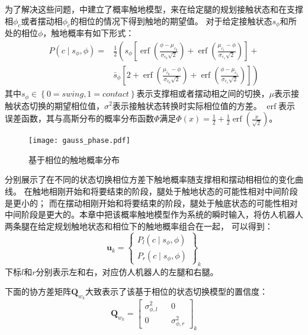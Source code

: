 为了解决这些问题，中建立了概率触地模型，来在给定腿的规划接触状态和在支撑相$\phi_c$或者摆动相$\phi_{\bar c}$的相位的情况下得到触地的期望值。
对于给定接触状态$s_{\phi}$和所处的相位$\phi$，触地概率有如下形式：
\begin{equation}
    \label{equ:est_contact_prob}
    \begin{aligned}
        P\left(c \mid s_\phi, \phi\right)= & \frac{1}{2}\left(s_\phi\left[\operatorname{erf}\left(\frac{\phi-\mu_{c_0}}{\sigma_{c_0} \sqrt{2}}\right)+\operatorname{erf}\left(\frac{\mu_{c_1}-\phi}{\sigma_{c_1} \sqrt{2}}\right)\right]+\right. \\
        & \left.\bar{s}_\phi\left[2+\operatorname{erf}\left(\frac{\mu_{\bar{c}_0}-\phi}{\sigma_{\bar{c}_0} \sqrt{2}}\right)+\operatorname{erf}\left(\frac{\phi-\mu_{\bar{c}_1}}{\sigma_{\bar{c}_1} \sqrt{2}}\right)\right]\right)
        \end{aligned}
\end{equation}
其中$s_{\phi} \in \left\{0=swing, 1=contact\right\}$表示支撑相或者摆动相之间的切换，$\mu$表示接触状态切换的期望相位值，$\sigma^2$表示接触状态转换时实际相位值的方差。
$\operatorname{erf}$表示误差函数，其与高斯分布的概率分布函数$\Phi$满足$\Phi(x)=\frac{1}{2}+\frac{1}{2} \operatorname{erf}\left(\frac{x}{\sqrt{2}}\right)$。
\begin{figure}[htbp]
    \centering
    \texttt{[image: gauss\_phase.pdf]}
    \caption{\label{fig:gauss_phase}基于相位的触地概率分布}
\end{figure}

分别展示了在不同的状态切换相位方差下触地概率随支撑相和摆动相相位的变化曲线。
在触地相刚开始和将要结束的阶段，腿处于触地状态的可能性相对中间阶段是更小的；
而在摆动相刚开始和将要结束的阶段，腿处于触底状态的可能性相对中间阶段是更大的。本章中把该概率触地模型作为系统的瞬时输入，将仿人机器人两条腿在给定规划触地状态和相位下的触地概率组合在一起，
可以得到：
\begin{equation}
    \label{equ:est_input}
    \boldsymbol{u}_k=\left\{\begin{array}{c}
        P_l\left(c \mid s_\phi, \phi\right) \\
        P_r\left(c \mid s_\phi, \phi\right)
        \end{array}\right\}_k
\end{equation}
下标$l$和$r$分别表示左和右，对应仿人机器人的左腿和右腿。

下面的协方差矩阵$\boldsymbol{Q}_{w_k}$大致表示了该基于相位的状态切换模型的置信度：
\begin{equation}
    \label{equ:est_process_noise}
    \boldsymbol{Q}_{w_k}=\left[\begin{array}{ccc}
        \sigma_{\phi, l}^2 & & 0 \\
        0 & & \sigma_{\phi, r}^2
        \end{array}\right]_k
\end{equation}

